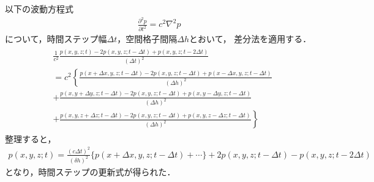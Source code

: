 以下の波動方程式
\begin{align}
\frac{\partial^2 p}{\partial t^2} =c^2 \nabla^2 p
\end{align}
について，時間ステップ幅$\Delta t$，空間格子間隔$\Delta h$とおいて，
差分法を適用する．
\begin{align}
\begin{aligned}
&\frac{1}{c^2} \frac{p(x, y, z; t)-2p(x, y, z; t-\Delta t)+p(x, y, z; t-2\Delta t)}{(\Delta t)^2} \\
&=c^2\left\{\frac{p(x+\Delta x, y, z; t-\Delta t)-2p(x, y, z; t-\Delta t)+p(x-\Delta x, y, z; t-\Delta t)}{(\Delta h)^2} \right.\\
&+\frac{p(x, y+\Delta y, z; t-\Delta t)-2p(x, y, z; t-\Delta t)+p(x, y-\Delta y, z; t-\Delta t)}{(\Delta h)^2} \\
&\left.+\frac{p(x, y, z+\Delta z; t-\Delta t)-2p(x, y, z; t-\Delta t)+p(x, y, z-\Delta z; t-\Delta t)}{(\Delta h)^2}\right\}
\end{aligned}
\end{align}
整理すると，
\begin{align}
p(x, y, z; t)=\frac{(c\Delta t)^2}{(\delta h)^2}\{p(x+\Delta x, y, z; t-\Delta t)+\cdots\}+2p(x, y, z; t-\Delta t)-p(x, y, z; t-2\Delta t)
\end{align}
となり，時間ステップの更新式が得られた．

